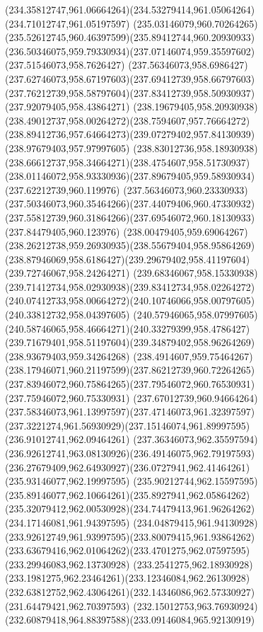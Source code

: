 {{\curveto(234.35812747,961.06664264)(234.53279414,961.05064264)(234.71012747,961.05197597)
\curveto(235.03146079,960.70264265)(235.52612745,960.46397599)(235.89412744,960.20930933)
\curveto(236.50346075,959.79330934)(237.07146074,959.35597602)(237.51546073,958.7626427)
\curveto(237.56346073,958.6986427)(237.62746073,958.67197603)(237.69412739,958.66797603)
\curveto(237.76212739,958.58797604)(237.83412739,958.50930937)(237.92079405,958.43864271)
\curveto(238.19679405,958.20930938)(238.49012737,958.00264272)(238.7594607,957.76664272)
\curveto(238.89412736,957.64664273)(239.07279402,957.84130939)(238.97679403,957.97997605)
\curveto(238.83012736,958.18930938)(238.66612737,958.34664271)(238.4754607,958.51730937)
\curveto(238.01146072,958.93330936)(237.89679405,959.58930934)(237.62212739,960.119976)
\curveto(237.56346073,960.23330933)(237.50346073,960.35464266)(237.44079406,960.47330932)
\curveto(237.55812739,960.31864266)(237.69546072,960.18130933)(237.84479405,960.123976)
\curveto(238.00479405,959.69064267)(238.26212738,959.26930935)(238.55679404,958.95864269)
\curveto(238.87946069,958.6186427)(239.29679402,958.41197604)(239.72746067,958.24264271)
\curveto(239.68346067,958.15330938)(239.71412734,958.02930938)(239.83412734,958.02264272)
\curveto(240.07412733,958.00664272)(240.10746066,958.00797605)(240.33812732,958.04397605)
\curveto(240.57946065,958.07997605)(240.58746065,958.46664271)(240.33279399,958.4786427)
\curveto(239.71679401,958.51197604)(239.34879402,958.96264269)(238.93679403,959.34264268)
\curveto(238.4914607,959.75464267)(238.17946071,960.21197599)(237.86212739,960.72264265)
\curveto(237.83946072,960.75864265)(237.79546072,960.76530931)(237.75946072,960.75330931)
\curveto(237.67012739,960.94664264)(237.58346073,961.13997597)(237.47146073,961.32397597)
\curveto(237.3221274,961.56930929)(237.15146074,961.89997595)(236.91012741,962.09464261)
\curveto(237.36346073,962.35597594)(236.92612741,963.08130926)(236.49146075,962.79197593)
\curveto(236.27679409,962.64930927)(236.0727941,962.41464261)(235.93146077,962.19997595)
\curveto(235.90212744,962.15597595)(235.89146077,962.10664261)(235.8927941,962.05864262)
\curveto(235.32079412,962.00530928)(234.74479413,961.96264262)(234.17146081,961.94397595)
\curveto(234.04879415,961.94130928)(233.92612749,961.93997595)(233.80079415,961.93864262)
\curveto(233.63679416,962.01064262)(233.4701275,962.07597595)(233.29946083,962.13730928)
\curveto(233.2541275,962.18930928)(233.1981275,962.23464261)(233.12346084,962.26130928)
\curveto(232.63812752,962.43064261)(232.14346086,962.57330927)(231.64479421,962.70397593)
\curveto(232.15012753,963.76930924)(232.60879418,964.88397588)(233.09146084,965.92130919)
}}
